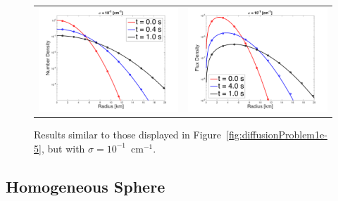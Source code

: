\documentclass[10pt,preprint]{aastex}
\begin{document}
\begin{figure}
  \begin{center}
    \begin{tabular}{cc}
      \includegraphics[scale=0.38]{./Figures/GaussianSphericalDiffusion_Kappa_1e-1_Density} &
      \includegraphics[scale=0.38]{./Figures/GaussianSphericalDiffusion_Kappa_1e-1_Flux}
    \end{tabular}
  \end{center}
  \caption{Results similar to those displayed in Figure~\ref{fig:diffusionProblem1e-5}, but with $\sigma=10^{-1}$~cm$^{-1}$.}
  \label{fig:diffusionProblem1e-1}
\end{figure}

\subsection{Homogeneous Sphere}
\end{document}
